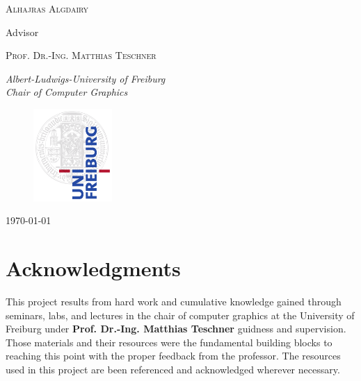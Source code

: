 \documentclass[11pt,a4paper]{article}
\begin{document}
\begin{titlepage}
	{\scshape\Large Alhajras Algdairy \\} %
	
			\vspace{0.5\baselineskip} %

		Advisor
	
	\vspace{0.5\baselineskip} %
	
	{\scshape\Large Prof. Dr.-Ing. Matthias Teschner\\} %

	\vspace{0.5\baselineskip} %
		
	\textit{Albert-Ludwigs-University of Freiburg \\ Chair of Computer Graphics} %
	
		
\begin{figure}[h]	
     \centering
         \includegraphics[width=3cm]{images/freiburg.png}
\end{figure}
	\vfill %
	
	


	
	\vspace{0.3\baselineskip} %
	
	\today%
	

\end{titlepage}

\clearpage

\section*{Acknowledgments}
This project results from hard work and cumulative knowledge gained through seminars, labs, and lectures in the chair of computer graphics at the University of Freiburg under \textbf{Prof. Dr.-Ing. Matthias Teschner} guidness and supervision. Those materials and their resources were the fundamental building blocks to reaching this point with the proper feedback from the professor. The resources used in this project are been referenced and acknowledged wherever necessary.
\\
\end{document}

